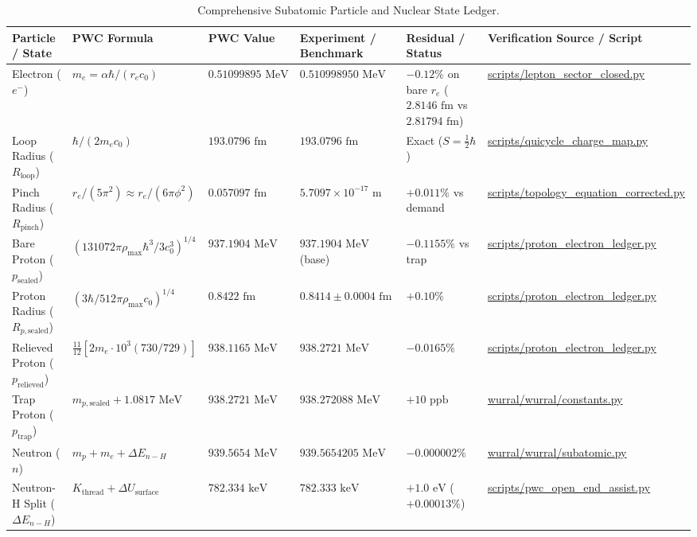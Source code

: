 \documentclass[11pt,a4paper]{article}
\begin{document}
\begin{table}[!htbp]
\centering
\caption{Comprehensive Subatomic Particle and Nuclear State Ledger.}
\label{tab:subatomic_ledger}
\scriptsize
\setlength{\tabcolsep}{2.8pt}
\renewcommand{\arraystretch}{1.30}
\begin{tabularx}{\textwidth}{L{2.25cm} L{3.32cm} L{2.28cm} L{2.38cm} Y L{2.5cm}}
\toprule
\textbf{Particle / State} & \textbf{PWC Formula} & \textbf{PWC Value} & \textbf{Experiment / Benchmark} & \textbf{Residual / Status} & \textbf{Verification Source / Script} \\
\midrule
Electron ($e^-$) & $m_e = \alpha\hbar / (r_e c_0)$ & $0.51099895\text{ MeV}$ & $0.510998950\text{ MeV}$ & $-0.12\%$ on bare $r_e$ ($2.8146\text{ fm}$ vs $2.81794\text{ fm}$) & \url{scripts/lepton_sector_closed.py} \\
Loop Radius ($R_{\text{loop}}$) & $\hbar / (2 m_e c_0)$ & $193.0796\text{ fm}$ & $193.0796\text{ fm}$ & Exact ($S = \frac{1}{2}\hbar$) & \url{scripts/quicycle_charge_map.py} \\
Pinch Radius ($R_{\text{pinch}}$) & $r_e / (5\pi^2) \approx r_e / (6\pi\phi^2)$ & $0.057097\text{ fm}$ & $5.7097 \times 10^{-17}\text{ m}$ & $+0.011\%$ vs demand & \url{scripts/topology_equation_corrected.py} \\
Bare Proton ($p_{\text{sealed}}$) & $(131072\pi\rho_{\max}\hbar^3/3c_0^3)^{1/4}$ & $937.1904\text{ MeV}$ & $937.1904\text{ MeV}$ (base) & $-0.1155\%$ vs trap & \url{scripts/proton_electron_ledger.py} \\
Proton Radius ($R_{p,\text{sealed}}$) & $(3\hbar/512\pi\rho_{\max}c_0)^{1/4}$ & $0.8422\text{ fm}$ & $0.8414 \pm 0.0004\text{ fm}$ & $+0.10\%$ & \url{scripts/proton_electron_ledger.py} \\
Relieved Proton ($p_{\text{relieved}}$) & $\frac{11}{12}[2m_e \cdot 10^3 (730/729)]$ & $938.1165\text{ MeV}$ & $938.2721\text{ MeV}$ & $-0.0165\%$ & \url{scripts/proton_electron_ledger.py} \\
Trap Proton ($p_{\text{trap}}$) & $m_{p,\text{sealed}} + 1.0817\text{ MeV}$ & $938.2721\text{ MeV}$ & $938.272088\text{ MeV}$ & $+10\text{ ppb}$ & \url{wurral/wurral/constants.py} \\
Neutron ($n$) & $m_p + m_e + \Delta E_{n-H}$ & $939.5654\text{ MeV}$ & $939.5654205\text{ MeV}$ & $-0.000002\%$ & \url{wurral/wurral/subatomic.py} \\
Neutron-H Split ($\Delta E_{n-H}$) & $K_{\text{thread}} + \Delta U_{\text{surface}}$ & $782.334\text{ keV}$ & $782.333\text{ keV}$ & $+1.0\text{ eV}$ ($+0.00013\%$) & \url{scripts/pwc_open_end_assist.py} \\

\end{tabularx}
\end{table}
\end{document}
